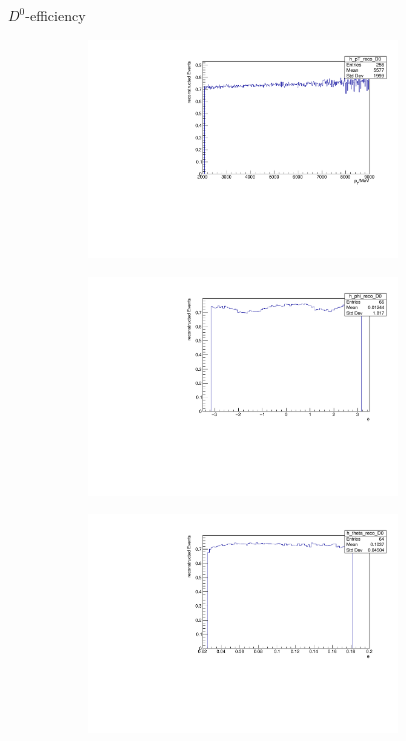 \documentclass[11pt]{beamer}
\begin{document}
\begin{frame}{$D^0$-efficiency}
\begin{figure}
\begin{subfigure}{0.45\textwidth}
\includegraphics[width=0.9\textwidth]{up_pdf/h_pt_reco_D0.pdf}
\end{subfigure}
\begin{subfigure}{0.45\textwidth}
\includegraphics[width=0.9\textwidth]{up_pdf/h_phi_reco_D0.pdf}
\end{subfigure}
\begin{subfigure}{0.45\textwidth}
\includegraphics[width=0.9\textwidth]{up_pdf/h_theta_reco_D0.pdf}

\end{subfigure}
\end{figure}
\end{frame}
\end{document}
